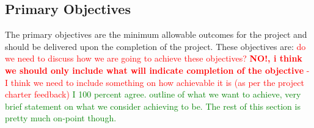 \documentclass[main.tex]{subfiles}
\begin{document}
\subsection{Primary Objectives}
The primary objectives are the minimum allowable outcomes for the project and should be delivered upon the completion of the project. These objectives are:
\textcolor{red}{do we need to discuss how we are going to achieve these objectives? \textbf{NO!, i think we should only include what will indicate completion of the objective } - I think we need to include something on how achievable it is (as per the project charter feedback)} \textcolor{green}{I 100 percent agree. outline of what we want to achieve, very brief statement on what we consider achieving to be. The rest of this section is pretty much on-point though.}
\end{document}
